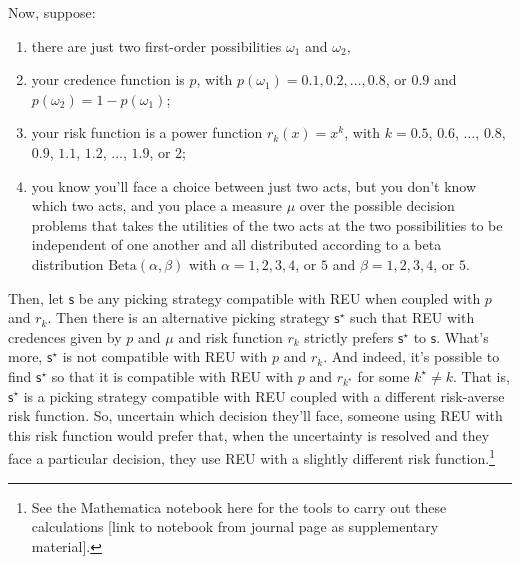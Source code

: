 \documentclass[a4paper]{article}
\newcommand\s{\mathsf{s}}
\newcommand{\todoinfo}[2][]{\todo[backgroundcolor=orange!80,bordercolor=black,linecolor=gray!80, #1,inline,caption={}]{#2}}
\newenvironment{CCM rewritten}
{\begingroup\color{blue}} %
{\endgroup}              %
\begin{document}


Now, suppose:
\begin{enumerate}[{\normalfont (i)}]
\item there are just two first-order possibilities $\omega_1$ and $\omega_2$,
\item your credence function is $p$, with $p(\omega_1) = 0.1, 0.2, \ldots, 0.8$, or $0.9$ and $p(\omega_2) = 1-p(\omega_1)$;
\item your risk function is a power function $r_k(x) = x^k$, with $k = 0.5$, $0.6$, $\ldots$, $0.8$, $0.9$, $1.1$, $1.2$, $\ldots$, $1.9$, or $2$;
\item you know you'll face a choice between just two acts, but you don't know which two acts, and you place a measure $\mu$ over the possible decision problems that takes the utilities of the two acts at the two possibilities to be independent of one another and all distributed according to a beta distribution $\mathrm{Beta}(\alpha, \beta)$ with $\alpha = 1, 2, 3, 4$, or $5$ and $\beta = 1, 2, 3, 4$, or $5$.\end{enumerate}
Then, let $\s$ be any picking strategy compatible with REU when coupled with $p$ and $r_k$. Then there is an alternative picking strategy $\s^\star$ such that REU with credences given by $p$ and $\mu$ and risk function $r_k$ strictly prefers $\s^\star$ to $\s$. What's more, $\s^\star$ is not compatible with REU with $p$ and $r_k$. And indeed, it's possible to find $\s^\star$ so that it is compatible with REU with $p$ and $r_{k^\star}$ for some $k^\star \neq k$. That is, $\s^\star$ is a picking strategy compatible with REU coupled with a different risk-averse risk function. So, uncertain which decision they'll face, someone using REU with this risk function would prefer that, when the uncertainty is resolved and they face a particular decision, they use REU with a slightly different risk function.\footnote{See the Mathematica notebook here for the tools to carry out these calculations [link to notebook from journal page as supplementary material].}\todoinfo{link to mathematica}

\end{document}
